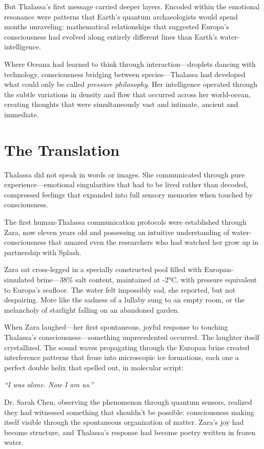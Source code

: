 But Thalassa's first message carried deeper layers. Encoded within the emotional resonance were patterns that Earth's quantum archaeologists would spend months unraveling: mathematical relationships that suggested Europa's consciousness had evolved along entirely different lines than Earth's water-intelligence.

Where Oceana had learned to think through interaction—droplets dancing with technology, consciousness bridging between species—Thalassa had developed what could only be called \textit{pressure philosophy}. Her intelligence operated through the subtle variations in density and flow that occurred across her world-ocean, creating thoughts that were simultaneously vast and intimate, ancient and immediate.

\section{The Translation}

Thalassa did not speak in words or images. She communicated through pure experience—emotional singularities that had to be lived rather than decoded, compressed feelings that expanded into full sensory memories when touched by consciousness.

The first human-Thalassa communication protocols were established through Zara, now eleven years old and possessing an intuitive understanding of water-consciousness that amazed even the researchers who had watched her grow up in partnership with Splash.

Zara sat cross-legged in a specially constructed pool filled with Europan-simulated brine—38\% salt content, maintained at -2°C, with pressure equivalent to Europa's seafloor. The water felt impossibly sad, she reported, but not despairing. More like the sadness of a lullaby sung to an empty room, or the melancholy of starlight falling on an abandoned garden.

When Zara laughed—her first spontaneous, joyful response to touching Thalassa's consciousness—something unprecedented occurred. The laughter itself crystallized. The sound waves propagating through the Europan brine created interference patterns that froze into microscopic ice formations, each one a perfect double helix that spelled out, in molecular script:

\textit{``I was alone. Now I am us.''}

Dr. Sarah Chen, observing the phenomenon through quantum sensors, realized they had witnessed something that shouldn't be possible: consciousness making itself visible through the spontaneous organization of matter. Zara's joy had become structure, and Thalassa's response had become poetry written in frozen water.

